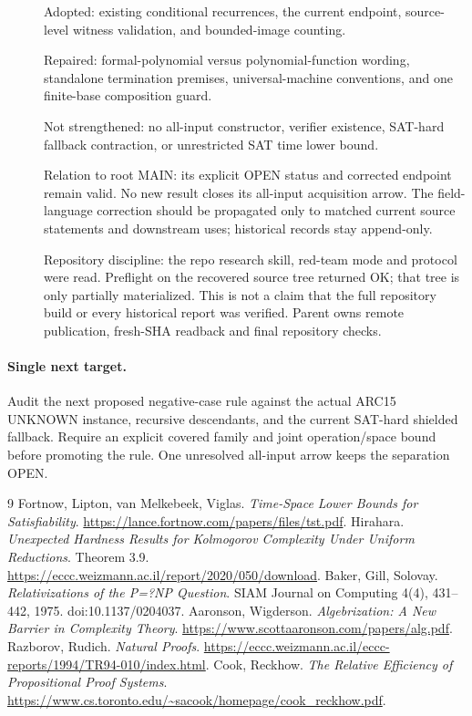 \documentclass[11pt]{article}
\begin{document}
\begin{description}
\item[] Adopted: existing conditional recurrences, the current endpoint,
source-level witness validation, and bounded-image counting.
\item[] Repaired: formal-polynomial versus polynomial-function wording,
standalone termination premises, universal-machine conventions, and one
finite-base composition guard.
\item[] Not strengthened: no all-input constructor, verifier existence,
SAT-hard fallback contraction, or unrestricted SAT time lower bound.
\item[] Relation to root MAIN: its explicit OPEN status and corrected
endpoint remain valid. No new result closes its all-input acquisition arrow.
The field-language correction should be propagated only to matched current
source statements and downstream uses; historical records stay append-only.
\item[] Repository discipline: the repo research skill, red-team mode and
protocol were read. Preflight on the recovered source tree returned OK;
that tree is only partially materialized. This is not a claim that the full
repository build or every historical report was verified. Parent owns remote
publication, fresh-SHA readback and final repository checks.
\end{description}

\paragraph{Single next target.}
Audit the next proposed negative-case rule against the actual ARC15 UNKNOWN
instance, recursive descendants, and the current SAT-hard shielded fallback.
Require an explicit covered family and joint operation/space bound before
promoting the rule. One unresolved all-input arrow keeps the separation OPEN.

\begin{thebibliography}{9}
 Fortnow, Lipton, van Melkebeek, Viglas.
\emph{Time-Space Lower Bounds for Satisfiability}.
\url{https://lance.fortnow.com/papers/files/tst.pdf}.
 Hirahara. \emph{Unexpected Hardness Results for Kolmogorov
Complexity Under Uniform Reductions}. Theorem 3.9.
\url{https://eccc.weizmann.ac.il/report/2020/050/download}.
 Baker, Gill, Solovay. \emph{Relativizations of the P=?NP Question}.
SIAM Journal on Computing 4(4), 431--442, 1975. doi:10.1137/0204037.
 Aaronson, Wigderson. \emph{Algebrization: A New Barrier in
Complexity Theory}. \url{https://www.scottaaronson.com/papers/alg.pdf}.
 Razborov, Rudich. \emph{Natural Proofs}.
\url{https://eccc.weizmann.ac.il/eccc-reports/1994/TR94-010/index.html}.
 Cook, Reckhow. \emph{The Relative Efficiency of Propositional
Proof Systems}. \url{https://www.cs.toronto.edu/~sacook/homepage/cook_reckhow.pdf}.
\end{thebibliography}
\end{document}
